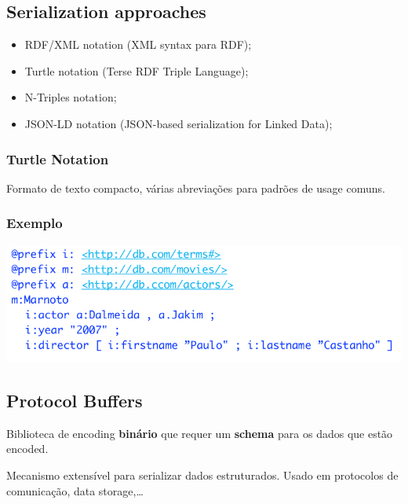 \documentclass{article}
\begin{document}
\subsection{Serialization approaches}

\begin{flushleft}
  \begin{itemize}
    \item RDF/XML notation (XML syntax para RDF);
    \item Turtle notation (Terse RDF Triple Language);
    \item N-Triples notation;
    \item JSON-LD notation (JSON-based serialization for Linked Data);
  \end{itemize}
\end{flushleft}

\pagebreak

\subsubsection{Turtle Notation}

Formato de texto compacto, várias abreviações para padrões de usage comuns.

\subsubsection*{Exemplo}

\begin{center}
  \includegraphics[scale=0.25]{64}
\end{center}

\subsection{Protocol Buffers}

Biblioteca de encoding \textbf{binário} que requer um \textbf{schema}
para os dados que estão encoded.

Mecanismo extensível para serializar dados estruturados. Usado em protocolos de
comunicação, data storage,\dots
\end{document}
